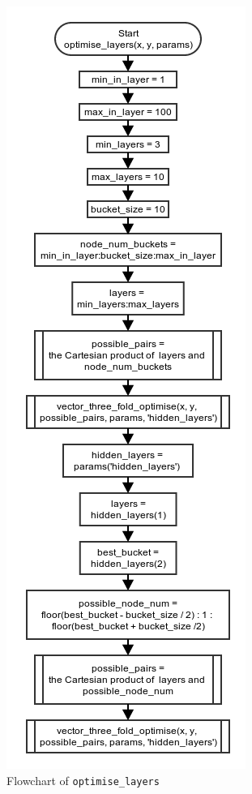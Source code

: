 \documentclass[10pt,a4paper]{article}
\begin{document}
\begin{figure}[!ht]
	\centering
	\includegraphics[scale=0.7]{images/flow_chart/optimise_layer.png}
	\caption{Flowchart of \tt{optimise\_layers}}
	\label{fig:optimise_layer}
\end{figure}
\end{document}
